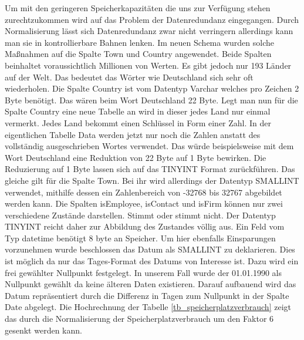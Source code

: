 Um mit den geringeren Speicherkapazitäten die uns zur Verfügung stehen zurechtzukommen wird auf das Problem der Datenredundanz eingegangen. Durch Normalisierung lässt sich Datenredundanz zwar nicht verringern allerdings kann man sie in kontrollierbare Bahnen lenken. Im neuen Schema wurden solche Maßnahmen auf die Spalte Town und Country angewendet. Beide Spalten beinhaltet voraussichtlich Millionen von Werten. Es gibt jedoch nur 193 Länder auf der Welt. Das bedeutet das Wörter wie Deutschland sich sehr oft wiederholen. Die Spalte Country ist vom Datentyp Varchar welches pro Zeichen 2 Byte benötigt. Das wären beim Wort Deutschland 22 Byte. Legt man nun für die Spalte Country eine neue Tabelle an wird in dieser jedes Land nur einmal vermerkt. Jedes Land bekommt einen Schlüssel in Form einer Zahl. In der eigentlichen Tabelle Data werden jetzt nur noch die Zahlen anstatt des vollständig ausgeschrieben Wortes verwendet. Das würde beispielsweise mit dem Wort Deutschland eine Reduktion von 22 Byte auf 1 Byte bewirken. Die Reduzierung auf 1 Byte lassen sich auf das TINYINT Format zurückführen. Das gleiche gilt für die Spalte Town. Bei ihr wird allerdings der Datentyp SMALLINT verwendet, mithilfe dessen ein Zahlenbereich von -32768 bis 32767 abgebildet werden kann. Die Spalten isEmployee, isContact und isFirm können nur zwei verschiedene Zustände darstellen. Stimmt oder stimmt nicht. Der Datentyp TINYINT reicht daher zur Abbildung des Zustandes völlig aus. Ein Feld vom Typ datetime benötigt 8 byte an Speicher. Um hier ebenfalls Einsparungen vorzunehmen wurde beschlossen das Datum als SMALLINT zu deklarieren. Dies ist möglich da nur das Tages-Format des Datums von Interesse ist. Dazu wird ein frei gewählter Nullpunkt festgelegt. In unserem Fall wurde der 01.01.1990 als Nullpunkt gewählt da keine älteren Daten existieren. Darauf aufbauend wird das Datum repräsentiert durch die Differenz in Tagen zum Nullpunkt in der Spalte Date abgelegt. Die Hochrechnung der Tabelle \ref{tb_speicherplatzverbrauch} zeigt das durch die Normalisierung der Speicherplatzverbrauch um den Faktor 6 gesenkt werden kann.

